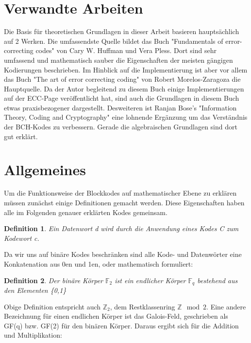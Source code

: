
\section{Verwandte Arbeiten}
\label{chapter:related}

Die Basis für theoretischen Grundlagen in dieser Arbeit basieren hauptsächlich auf 2 Werken. Die umfassendste Quelle bildet das Buch "Fundamentals of error-correcting codes" von Cary W. Huffman und Vera Pless.\cite{huffman2010fundamentals} Dort sind sehr umfassend und mathematisch sauber die Eigenschaften der meisten gängigen Kodierungen beschrieben. Im Hinblick auf die Implementierung ist aber vor allem das Buch "The art of error correcting coding" von Robert Morelos-Zaragoza\cite{morelos2006art} die Hauptquelle. Da der Autor begleitend zu diesem Buch einige Implementierungen auf der ECC-Page\cite{eccpage} veröffentlicht hat, sind auch die Grundlagen in diesem Buch etwas praxisbezogener dargestellt. Desweiteren ist Ranjan Bose's "Information Theory, Coding and Cryptography"\cite{bose2008infotheory} eine lohnende Ergänzung um das Verständnis der BCH-Kodes zu verbessern. Gerade die algebraischen Grundlagen sind dort gut erklärt.

\section{Allgemeines}

Um die Funktionsweise der Blockkodes auf mathematischer Ebene zu erklären müssen zunächst einige Definitionen gemacht werden. Diese Eigenschaften haben alle im Folgenden genauer erklärten Kodes gemeinsam.
\newtheorem{t_def}{Definition}[chapter]

\begin{t_def}
Ein {\em Datenwort d} wird durch die Anwendung eines {\em Kodes C} zum {\em Kodewort c}.
\end{t_def}

Da wir uns auf binäre Kodes beschränken sind alle Kode- und Datenwörter eine Konkatenation aus 0en und 1en, oder mathematisch formuliert:

\begin{t_def}
Der binäre Körper $\mathbb{F}_{2}$ ist ein endlicher Körper $\mathbb{F}_{q}$ bestehend aus den Elementen \{0,1\}
\end{t_def}

Obige Definition entspricht auch $\mathbb{Z}_2$, dem Restklassenring $\mathbb{Z}\mod 2$. Eine andere Bezeichnung für einen endlichen Körper ist das Galois-Feld, geschrieben als GF(q) bzw. GF(2) für den binären Körper. Daraus ergibt sich für die Addition und Multiplikation:\newline

